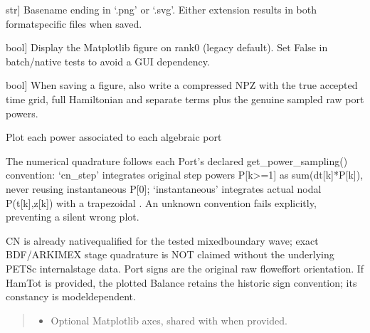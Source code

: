 \documentclass[letterpaper,10pt,english]{sphinxmanual}
\begin{document}
\begin{fulllineitems}
\begin{fulllineitems}
\begin{description}
\sphinxlineitem{filename}{[}str{]}
\sphinxAtStartPar
Basename ending in ‘.png’ or ‘.svg’. Either extension
results in both format\sphinxhyphen{}specific files when saved.

\sphinxlineitem{show}{[}bool{]}
\sphinxAtStartPar
Display the Matplotlib figure on rank0 (legacy default).
Set False in batch/native tests to avoid a GUI dependency.

\sphinxlineitem{save\_data}{[}bool{]}
\sphinxAtStartPar
When saving a figure, also write a compressed NPZ with the
true accepted time grid, full Hamiltonian and separate
terms plus the genuine sampled raw port powers.

\end{description}

\end{fulllineitems}


\begin{fulllineitems}
\label{\detokenize{scrimp:scrimp.dphs.DPHS.plot_powers}}
\pysigstartsignatures
\pysiglinewithargsret
{}
{\sphinxparamcomma {}}
{}
\pysigstopsignatures
\sphinxAtStartPar
Plot each power associated to each algebraic port

\sphinxAtStartPar
The numerical quadrature follows each Port’s declared
get\_power\_sampling() convention: ‘cn\_step’ integrates original
step powers P{[}k\textgreater{}=1{]} as sum(dt{[}k{]}*P{[}k{]}), never reusing
instantaneous P{[}0{]}; ‘instantaneous’ integrates actual nodal
P(t{[}k{]},z{[}k{]}) with a trapezoidal . An unknown
convention fails explicitly, preventing a silent wrong plot.

\sphinxAtStartPar
CN is already native\sphinxhyphen{}qualified for the tested mixed\sphinxhyphen{}boundary
wave; exact BDF/ARKIMEX stage quadrature is NOT claimed
without the underlying PETSc internal\sphinxhyphen{}stage data. Port signs
are the original raw flow\sphinxhyphen{}effort orientation.
If HamTot is provided, the plotted Balance retains the historic
sign convention; its constancy is model\sphinxhyphen{}dependent.
\begin{quote}\begin{description}
\begin{itemize}
\item {} 
\sphinxAtStartPar
{} \textendash{} Optional Matplotlib axes, shared with
 when provided.


\end{itemize}
\end{description}
\end{quote}
\end{fulllineitems}
\end{fulllineitems}
\end{document}
